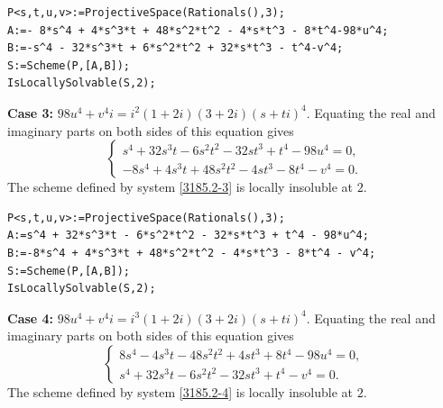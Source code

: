 \documentclass[a4paper,12pt,english,reqno]{amsart}
\begin{document}

\begin{lstlisting}
P<s,t,u,v>:=ProjectiveSpace(Rationals(),3);
A:=- 8*s^4 + 4*s^3*t + 48*s^2*t^2 - 4*s*t^3 - 8*t^4-98*u^4;
B:=-s^4 - 32*s^3*t + 6*s^2*t^2 + 32*s*t^3 - t^4-v^4;
S:=Scheme(P,[A,B]);
IsLocallySolvable(S,2);
\end{lstlisting}

{\bf Case 3:}  $98u^4+v^4i=i^2(1+2i)(3+2i)(s+ti)^4$. Equating the real and imaginary parts on both sides of this equation gives
\begin{equation}\label{3185.2-3}
\begin{cases}
s^4 + 32s^3t - 6s^2t^2 - 32st^3 + t^4 - 98u^4=0, \\
-8s^4 + 4s^3t + 48s^2t^2 - 4st^3 - 8t^4 - v^4=0.
\end{cases}
\end{equation}
The scheme defined by system \eqref{3185.2-3} is locally insoluble at $2$.


\begin{lstlisting}
P<s,t,u,v>:=ProjectiveSpace(Rationals(),3);
A:=s^4 + 32*s^3*t - 6*s^2*t^2 - 32*s*t^3 + t^4 - 98*u^4;
B:=-8*s^4 + 4*s^3*t + 48*s^2*t^2 - 4*s*t^3 - 8*t^4 - v^4;
S:=Scheme(P,[A,B]);
IsLocallySolvable(S,2);
\end{lstlisting}

{\bf Case 4:}  $98u^4+v^4i=i^3(1+2i)(3+2i)(s+ti)^4$. Equating the real and imaginary parts on both sides of this equation gives
\begin{equation}\label{3185.2-4}
\begin{cases}
8s^4 - 4s^3t - 48s^2t^2 + 4st^3 + 8t^4 - 98u^4=0,\\
s^4 + 32s^3t - 6s^2t^2 - 32st^3 + t^4 - v^4=0.
\end{cases}
\end{equation}
The scheme defined by system \eqref{3185.2-4} is locally insoluble at $2$.
\end{document}
